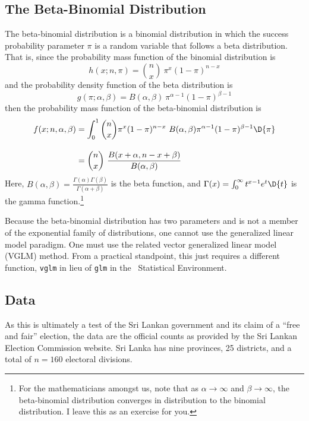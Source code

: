 \subsection{The Beta-Binomial Distribution}
The beta-binomial distribution is a binomial distribution in which the success probability parameter $\pi$ is a random variable that follows a beta distribution.\cite{skellam-1948} That is, since the probability mass function of the binomial distribution is
\begin{equation}
h(x; n, \pi) = \binom{n}{x}\ \pi^x (1-\pi)^{n-x}
\end{equation}
and the probability density function of the beta distribution is
\begin{equation}
g(\pi; \alpha, \beta) = B(\alpha, \beta)\ \pi^{\alpha-1} (1-\pi)^{\beta-1}
\end{equation}
then the probability mass function of the beta-binomial distribution is
\begin{align}
f(x; n, \alpha, \beta) &= \int_0^1 \binom{n}{x} \pi^x (1-\pi)^{n-x}\ B(\alpha, \beta) \pi^{\alpha-1} (1-\pi)^{\beta-1} \D{\pi} \\[1em]
	&= \binom{n}{x}\ \frac{B(x+\alpha, n-x+\beta)}{B(\alpha, \beta)}
\end{align}
Here, $B(\alpha, \beta) = \frac{\Gamma(\alpha)\Gamma(\beta)}{\Gamma(\alpha+\beta)}$ is the beta function, and $\Gamma(x) = \int_0^\infty t^{x-1}e^t \D{t}$ is the gamma function.\footnote{For the mathematicians amongst us, note that as $\alpha \rightarrow \infty$ and $\beta \rightarrow \infty$, the beta-binomial distribution converges in distribution to the binomial distribution. I leave this as an exercise for you.}

Because the beta-binomial distribution has two parameters and is not a member of the exponential family of distributions, one cannot use the generalized linear model paradigm. One must use the related vector generalized linear model (VGLM) method.\cite{yee-2010,yee-2015} From a practical standpoint, this just requires a different function, \texttt{vglm} in lieu of \texttt{glm} in the \R\ Statistical Environment.\cite{rprogram}









\subsection{Data}
As this is ultimately a test of the Sri Lankan government and its claim of a ``free and fair'' election, the data are the official counts as provided by the Sri Lankan Election Commission website.\cite{sri1994pres,sri1999pres, sri2005pres,sri2010pres,sri2015pres,sri2019pres} Sri Lanka has nine provinces, 25 districts, and a total of $n=160$ electoral divisions.\cite{electioncommission-2018a}

